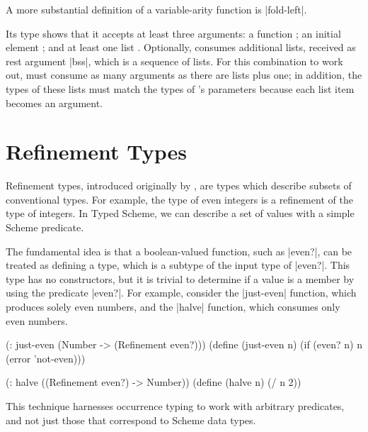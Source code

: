\begin{schemeregion}
A more substantial definition of a variable-arity function is \scheme|fold-left|.
\begin{exmp}
\label{ex:fold-left}
\end{exmp}

Its type shows that it accepts at least three arguments: a
 function ; an initial element ;
 and at least one list . Optionally,
  consumes additional lists, received as rest
 argument \scheme|bss|, which is a sequence of lists. For
 this combination to work out,  must consume as many arguments as
 there are lists plus one; in addition, the types of these lists must match
 the types of 's parameters because each list item 
 becomes an argument. 

\section{Refinement Types}
\label{sec:refinement-intro}

Refinement types, introduced originally by \citet{fp:refinement}, are
types which describe subsets of conventional types.  For example, the
type of even integers is a refinement of the type of integers.  In
Typed Scheme, we can describe a set of values with a simple Scheme
predicate.

The fundamental idea is that a boolean-valued function, such as
\scheme|even?|, can be treated as defining a type, which is a subtype
of the input type of \scheme|even?|.  This type has no constructors,
but it is trivial to determine if a value is a member by using the
predicate \scheme|even?|.  For example, consider the
\scheme|just-even| function, which produces solely
even numbers, and the \scheme|halve| function, which consumes only
even numbers.

\begin{exmp}
\begin{schemedisplay}
(: just-even (Number -> (Refinement even?)))
(define (just-even n)
  (if (even? n) n (error 'not-even)))

(: halve ((Refinement even?) -> Number))
(define (halve n) (/ n 2))
\end{schemedisplay}
\label{ex:refinement}
\end{exmp}

This technique harnesses occurrence typing to work with arbitrary
predicates, and not just those that correspond to Scheme data types.  

\end{schemeregion}
